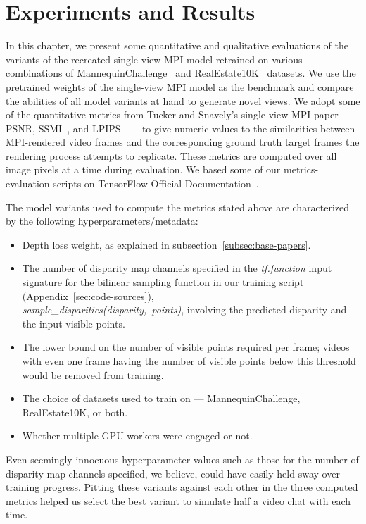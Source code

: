 \chapter{Experiments and Results}\label{ch4:experiments-results}

In this chapter, we present some quantitative and qualitative evaluations of the variants of the recreated single-view MPI model retrained on various combinations of MannequinChallenge~\cite{li2019learning} and RealEstate10K~\cite{zhou2018stereo} datasets. We use the pretrained weights of the single-view MPI model as the benchmark and compare the abilities of all model variants at hand to generate novel views. We adopt some of the quantitative metrics from Tucker and Snavely's single-view MPI paper~\cite{single_view_mpi} --- PSNR, SSMI~\cite{wang_image_2004}, and LPIPS~\cite{zhang_unreasonable_2018} --- to give numeric values to the similarities between MPI-rendered video frames and the corresponding ground truth target frames the rendering process attempts to replicate. These metrics are computed over all image pixels at a time during evaluation. We based some of our metrics-evaluation scripts on TensorFlow Official Documentation~\cite{noauthor_tfimagepsnr_nodate,noauthor_tfimagessim_nodate}.

The model variants used to compute the metrics stated above are characterized by the following hyperparameters/metadata:
\begin{itemize}
    \item Depth loss weight, as explained in subsection~\ref{subsec:base-papers}.
    \item The number of disparity map channels specified in the \textit{tf.function} input signature for the bilinear sampling function in our training script (Appendix~\ref{sec:code-sources}),\\\textit{sample\_disparities(disparity,\ points)}, involving the predicted disparity and the input visible points.
    \item The lower bound on the number of visible points required per frame; videos with even one frame having the number of visible points below this threshold would be removed from training.
    \item The choice of datasets used to train on --- MannequinChallenge, RealEstate10K, or both.
    \item Whether multiple GPU workers were engaged or not.
\end{itemize}
Even seemingly innocuous hyperparameter values such as those for the number of disparity map channels specified, we believe, could have easily held sway over training progress. Pitting these variants against each other in the three computed metrics helped us select the best variant to simulate half a video chat with each time.

